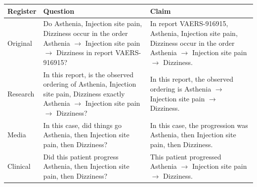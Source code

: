 \documentclass[11pt]{article}
\begin{document}
\begin{tabularx}{\linewidth}{@{}l L L@{}}
\toprule
\textbf{Register} & \textbf{Question} & \textbf{Claim} \\
\midrule
Original & Do Asthenia, Injection site pain, Dizziness occur in the order Asthenia $\rightarrow$  Injection site pain $\rightarrow$  Dizziness in report VAERS-916915? & In report VAERS-916915, Asthenia, Injection site pain, Dizziness occur in the order Asthenia $\rightarrow$  Injection site pain $\rightarrow$  Dizziness. \\
Research & In this report, is the observed ordering of Asthenia, Injection site pain, Dizziness exactly Asthenia $\rightarrow$  Injection site pain $\rightarrow$  Dizziness? & In this report, the observed ordering is Asthenia $\rightarrow$  Injection site pain $\rightarrow$  Dizziness. \\
Media & In this case, did things go Asthenia, then Injection site pain, then Dizziness? & In this case, the progression was Asthenia, then Injection site pain, then Dizziness. \\
Clinical & Did this patient progress Asthenia, then Injection site pain, then Dizziness? & This patient progressed Asthenia $\rightarrow$  Injection site pain $\rightarrow$  Dizziness. \\
\bottomrule
\end{tabularx}
\vspace{3pt}
\end{document}
